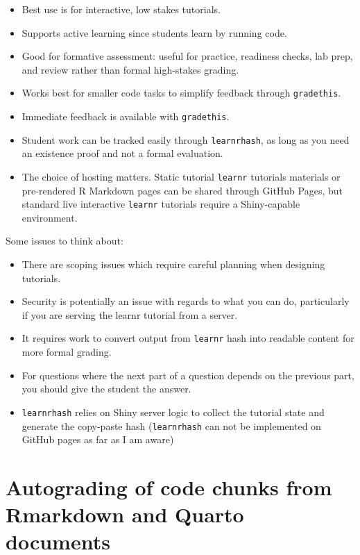 \documentclass[
  12pt]{article}
\providecommand{\tightlist}{%
  \setlength{\itemsep}{0pt}\setlength{\parskip}{0pt}}
\begin{document}
\begin{itemize}
\tightlist
\item
  Best use is for interactive, low stakes tutorials.
\item
  Supports active learning since students learn by running code.
\item
  Good for formative assessment: useful for practice, readiness checks,
  lab prep, and review rather than formal high-stakes grading.
\item
  Works best for smaller code tasks to simplify feedback through
  \texttt{gradethis}.
\item
  Immediate feedback is available with \texttt{gradethis}.
\item
  Student work can be tracked easily through \texttt{learnrhash}, as
  long as you need an existence proof and not a formal evaluation.
\item
  The choice of hosting matters. Static tutorial \texttt{learnr}
  tutorials materials or pre-rendered R Markdown pages can be shared
  through GitHub Pages, but standard live interactive \texttt{learnr}
  tutorials require a Shiny-capable environment.
\end{itemize}

Some issues to think about:

\begin{itemize}
\tightlist
\item
  There are scoping issues which require careful planning when designing
  tutorials.
\item
  Security is potentially an issue with regards to what you can do,
  particularly if you are serving the learnr tutorial from a server.
\item
  It requires work to convert output from \texttt{learnr} hash into
  readable content for more formal grading.
\item
  For questions where the next part of a question depends on the
  previous part, you should give the student the answer.
\item
  \texttt{learnrhash} relies on Shiny server logic to collect the
  tutorial state and generate the copy-paste hash (\texttt{learnrhash}
  can not be implemented on GitHub pages as far as I am aware)
\end{itemize}

\section{Autograding of code chunks from Rmarkdown and Quarto
documents}\label{sec-autograde}
\end{document}
